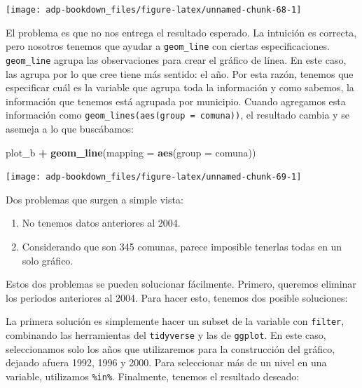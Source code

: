 \documentclass[]{book}
\newenvironment{Shaded}{\begin{snugshade}}{\end{snugshade}}
\newcommand{\DataTypeTok}[1]{\textcolor[rgb]{0.13,0.29,0.53}{#1}}
\newcommand{\KeywordTok}[1]{\textcolor[rgb]{0.13,0.29,0.53}{\textbf{#1}}}
\newcommand{\NormalTok}[1]{#1}
\newcommand{\OperatorTok}[1]{\textcolor[rgb]{0.81,0.36,0.00}{\textbf{#1}}}
\newcommand{\StringTok}[1]{\textcolor[rgb]{0.31,0.60,0.02}{#1}}
\providecommand{\tightlist}{%
  \setlength{\itemsep}{0pt}\setlength{\parskip}{0pt}}
\begin{document}
\begin{center}\texttt{[image: adp-bookdown\_files/figure-latex/unnamed-chunk-68-1]} \end{center}

El problema es que no nos entrega el resultado esperado. La intuición es
correcta, pero nosotros tenemos que ayudar a \texttt{geom\_line} con
ciertas especificaciones. \texttt{geom\_line} agrupa las observaciones
para crear el gráfico de línea. En este caso, las agrupa por lo que cree
tiene más sentido: el año. Por esta razón, tenemos que especificar cuál
es la variable que agrupa toda la información y como sabemos, la
información que tenemos está agrupada por municipio. Cuando agregamos
esta información como \texttt{geom\_lines(aes(group\ =\ comuna))}, el
resultado cambia y se asemeja a lo que buscábamos:

\begin{Shaded}
\begin{Highlighting}[]
\NormalTok{plot_b }\OperatorTok{+}\StringTok{ }
\StringTok{  }\KeywordTok{geom_line}\NormalTok{(}\DataTypeTok{mapping =} \KeywordTok{aes}\NormalTok{(}\DataTypeTok{group =}\NormalTok{ comuna))}
\end{Highlighting}
\end{Shaded}

\begin{center}\texttt{[image: adp-bookdown\_files/figure-latex/unnamed-chunk-69-1]} \end{center}

Dos problemas que surgen a simple vista:

\begin{enumerate}
\def\labelenumi{\arabic{enumi}.}
\tightlist
\item
  No tenemos datos anteriores al 2004.
\item
  Considerando que son 345 comunas, parece imposible tenerlas todas en
  un solo gráfico.
\end{enumerate}

Estos dos problemas se pueden solucionar fácilmente. Primero, queremos
eliminar los periodos anteriores al 2004. Para hacer esto, tenemos dos
posible soluciones:

La primera solución es simplemente hacer un subset de la variable con
\texttt{filter}, combinando las herramientas del \texttt{tidyverse} y
las de \texttt{ggplot}. En este caso, seleccionamos solo los años que
utilizaremos para la construcción del gráfico, dejando afuera 1992, 1996
y 2000. Para seleccionar más de un nivel en una variable, utilizamos
\texttt{\%in\%}. Finalmente, tenemos el resultado deseado:
\end{document}
